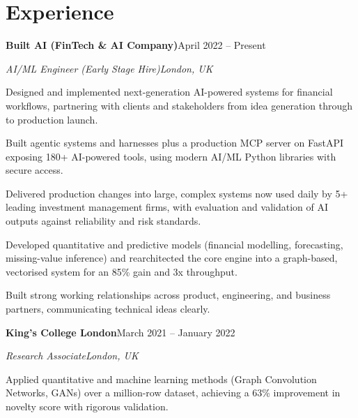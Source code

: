 \documentclass[10pt,a4paper]{article}
\newcommand{\entry}[4]{%
  {\color{company}\bfseries #1}\hfill {\color{muted}#2}\par
  \vspace{1pt}
  {\itshape #3}\hfill {\color{muted}\itshape #4}\par
  \vspace{3pt}%
}
\begin{document}
\section{Experience}
\entry{Built AI (FinTech \& AI Company)}{April 2022 -- Present}{AI/ML Engineer (Early Stage Hire)}{London, UK}
\begin{tight}
  \item Designed and implemented next-generation AI-powered systems for financial workflows, partnering with clients and stakeholders from idea generation through to production launch.
  \item Built agentic systems and harnesses plus a production MCP server on FastAPI exposing 180+ AI-powered tools, using modern AI/ML Python libraries with secure access.
  \item Delivered production changes into large, complex systems now used daily by 5+ leading investment management firms, with evaluation and validation of AI outputs against reliability and risk standards.
  \item Developed quantitative and predictive models (financial modelling, forecasting, missing-value inference) and rearchitected the core engine into a graph-based, vectorised system for an 85\% gain and 3x throughput.
  \item Built strong working relationships across product, engineering, and business partners, communicating technical ideas clearly.
\end{tight}

\entry{King's College London}{March 2021 -- January 2022}{Research Associate}{London, UK}
\begin{tight}
  \item Applied quantitative and machine learning methods (Graph Convolution Networks, GANs) over a million-row dataset, achieving a 63\% improvement in novelty score with rigorous validation.
\end{tight}

\end{document}
